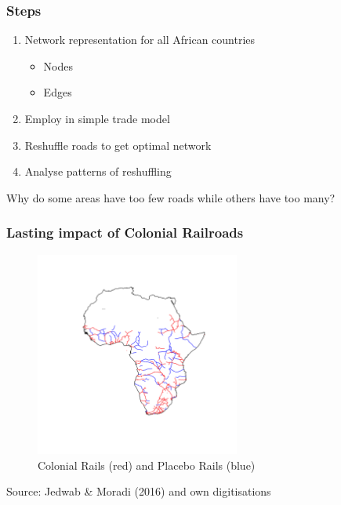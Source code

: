 \documentclass[]{beamer}   	%
\begin{document}
\begin{frame}
  \frametitle{Steps}
  \begin{enumerate}
    \item Network representation for all African countries
    \begin{itemize}
      \item Nodes
      \item Edges
    \end{itemize}
    \item Employ in simple trade model
    \item Reshuffle roads to get optimal network
    \item \alert{Analyse patterns of reshuffling}
  \end{enumerate}
\end{frame}

\begin{frame}
Why do some areas have too few roads while others have too many?
\end{frame}

\begin{frame}
\frametitle{Lasting impact of Colonial Railroads}
\begin{figure}
\centering
\includegraphics[width=0.6\textwidth,trim={10cm 11cm 6cm 10cm},clip]{../../Analysis/output/other_maps/all_rails.png}
\caption{Colonial Rails (red) and Placebo Rails (blue)}
\label{fig:Rail Maps}
\end{figure}
  \tiny Source: Jedwab \& Moradi (2016) and own digitisations
\end{frame}
\end{document}
